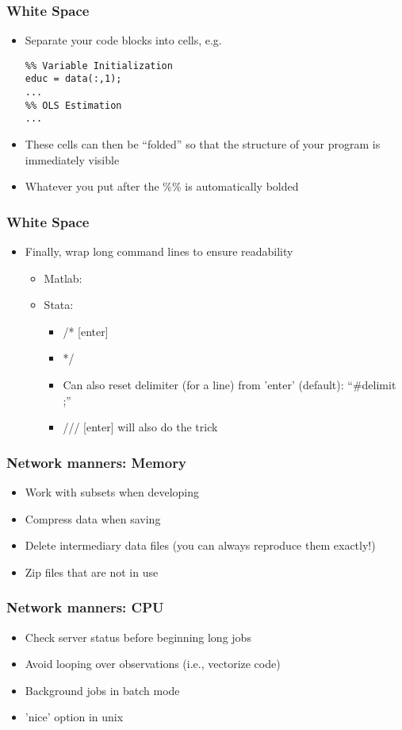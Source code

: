 \documentclass[english,xcolor=dvipsnames]{beamer}
\newcommand{\bi}{\begin{itemize}}
\newcommand{\ei}{\end{itemize}}
\begin{document}
\begin{frame}[fragile]
\frametitle{White Space}
\bi
   \item Separate your code blocks into cells, e.g.
\begin{lstlisting}
%% Variable Initialization
educ = data(:,1);
...
%% OLS Estimation
...
\end{lstlisting}
   \item These cells can then be ``folded'' so that the structure of your program is immediately visible
   \item Whatever you put after the \%\% is automatically bolded
\ei
\end{frame}

\begin{frame}
\frametitle{White Space}

   \bi 
   \item Finally, wrap long command lines to ensure readability
      \bi 
      \item Matlab:  
      \item Stata: 
         \bi 
         \item /* [enter]
         \item   */ 
         \item Can also reset delimiter (for a line) from 'enter' (default): ``\#delimit ;''
         \item /// [enter] will also do the trick
         \ei
      \ei
   \ei
\end{frame}

\begin{frame}
\frametitle{Network manners: Memory}

   \bi 
   \item Work with subsets when developing
   \item Compress data when saving
   \item Delete intermediary data files (you can always reproduce them exactly!)
   \item Zip files that are not in use
   \ei
\end{frame}

\begin{frame}
\frametitle{Network manners: CPU}

   \bi 
   \item Check server status before beginning long jobs
   \item Avoid looping over observations (i.e., vectorize code)
   \item Background jobs in batch mode
   \item 'nice' option in unix
   \ei
\end{frame}
\end{document}
